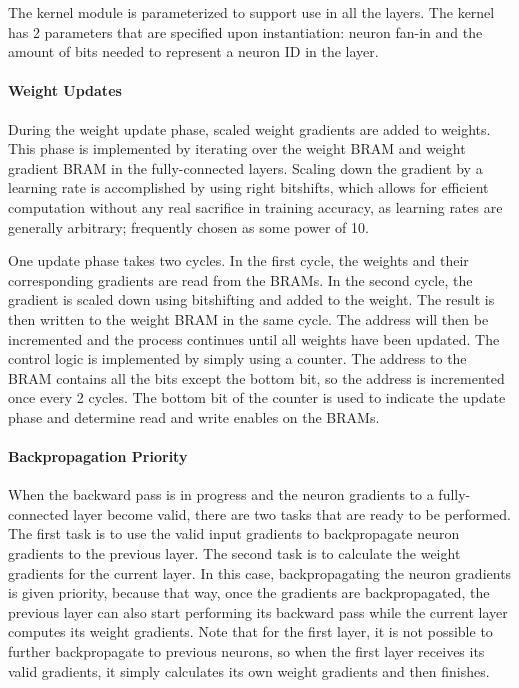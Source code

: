 The kernel module is parameterized to support use in all the layers. The kernel has 2 parameters that are specified upon instantiation: neuron fan-in and the amount of bits needed to represent a neuron ID in the layer.

\paragraph{Weight Updates}
During the weight update phase, scaled weight gradients are added to weights. This phase is implemented by iterating over the weight BRAM and weight gradient BRAM in the fully-connected layers. Scaling down the gradient by a learning rate is accomplished by using right bitshifts, which allows for efficient computation without any real sacrifice in training accuracy, as learning rates are generally arbitrary; frequently chosen as some power of 10.

One update phase takes two cycles. In the first cycle, the weights and their corresponding gradients are read from the BRAMs. In the second cycle, the gradient is scaled down using bitshifting and added to the weight. The result is then written to the weight BRAM in the same cycle. The address will then be incremented and the process continues until all weights have been updated. The control logic is implemented by simply using a counter. The address to the BRAM contains all the bits except the bottom bit, so the address is incremented once every 2 cycles. The bottom bit of the counter is used to indicate the update phase and determine read and write enables on the BRAMs.

\paragraph{Backpropagation Priority}
When the backward pass is in progress and the neuron gradients to a fully-connected layer become valid, there are two tasks that are ready to be performed. The first task is to use the valid input gradients to backpropagate neuron gradients to the previous layer. The second task is to calculate the weight gradients for the current layer. In this case, backpropagating the neuron gradients is given priority, because that way, once the gradients are backpropagated, the previous layer can also start performing its backward pass while the current layer computes its weight gradients. Note that for the first layer, it is not possible to further backpropagate to previous neurons, so when the first layer receives its valid gradients, it simply calculates its own weight gradients and then finishes.

